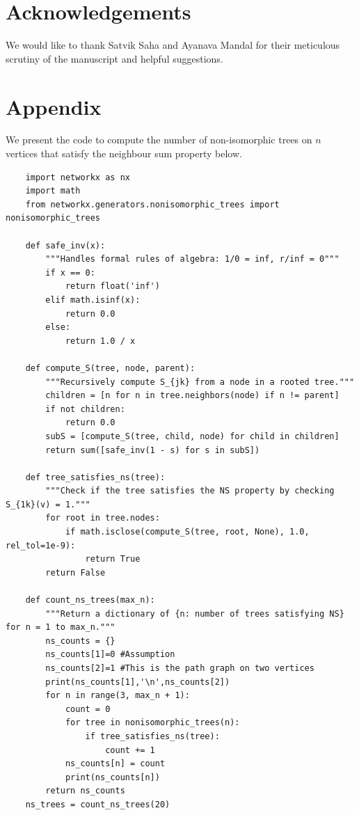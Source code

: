 \documentclass[11pt]{article}
\begin{document}



\section{Acknowledgements}
We would like to thank Satvik Saha and Ayanava Mandal for their meticulous scrutiny of the manuscript and helpful suggestions.

\clearpage
\section{Appendix}\label{app}
We present the code to compute the number of non-isomorphic trees on $n$ vertices that satisfy the neighbour sum property below.

\begin{verbatim}
    import networkx as nx
    import math
    from networkx.generators.nonisomorphic_trees import nonisomorphic_trees
    
    def safe_inv(x):
        """Handles formal rules of algebra: 1/0 = inf, r/inf = 0"""
        if x == 0:
            return float('inf')
        elif math.isinf(x):
            return 0.0
        else:
            return 1.0 / x
    
    def compute_S(tree, node, parent):
        """Recursively compute S_{jk} from a node in a rooted tree."""
        children = [n for n in tree.neighbors(node) if n != parent]
        if not children:
            return 0.0
        subS = [compute_S(tree, child, node) for child in children]
        return sum([safe_inv(1 - s) for s in subS])
    
    def tree_satisfies_ns(tree):
        """Check if the tree satisfies the NS property by checking S_{1k}(v) = 1."""
        for root in tree.nodes:
            if math.isclose(compute_S(tree, root, None), 1.0, rel_tol=1e-9):
                return True
        return False
    
    def count_ns_trees(max_n):
        """Return a dictionary of {n: number of trees satisfying NS} for n = 1 to max_n."""
        ns_counts = {}
        ns_counts[1]=0 #Assumption
        ns_counts[2]=1 #This is the path graph on two vertices
        print(ns_counts[1],'\n',ns_counts[2])
        for n in range(3, max_n + 1):
            count = 0
            for tree in nonisomorphic_trees(n):
                if tree_satisfies_ns(tree):
                    count += 1
            ns_counts[n] = count
            print(ns_counts[n])
        return ns_counts
    ns_trees = count_ns_trees(20)
\end{verbatim}
\end{document}
